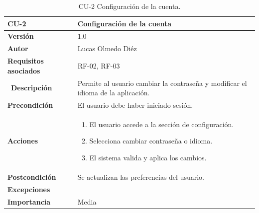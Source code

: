 \clearpage
\begin{table}[p]
    \centering
    \begin{tabularx}{\linewidth}{ p{} p{} }
        \toprule
        \textbf{CU-2}    & Configuración de la cuenta \\
        \midrule
        \textbf{Versión}              & 1.0 \\
        \textbf{Autor}                & Lucas Olmedo Diéz \\
        \textbf{Requisitos asociados} & RF-02, RF-03 \\\
        \textbf{Descripción}          & Permite al usuario cambiar la contraseña y modificar el idioma de la aplicación. \\
        \textbf{Precondición}         & El usuario debe haber iniciado sesión. \\
        \textbf{Acciones}             &
        \begin{enumerate}
            \def\labelenumi{\arabic{enumi}.}
            \tightlist
            \item El usuario accede a la sección de configuración.
            \item Selecciona cambiar contraseña o idioma.
            \item El sistema valida y aplica los cambios.
        \end{enumerate}\\
        \textbf{Postcondición}        & Se actualizan las preferencias del usuario. \\
        \textbf{Excepciones}          & \\
        \textbf{Importancia}          & Media \\
        \bottomrule
    \end{tabularx}
    \caption{CU-2 Configuración de la cuenta.}
\end{table}

